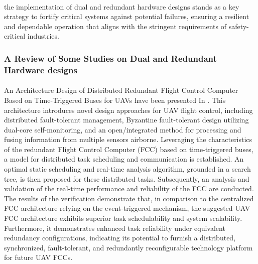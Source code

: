\paragraph*{}
the implementation of dual and redundant hardware designs stands as a key strategy to fortify critical systems against potential failures, ensuring a resilient and dependable operation that aligns with the stringent requirements of safety-critical industries.
\subsubsection{A Review of Some Studies on Dual and Redundant Hardware designs}
\paragraph*{}
An Architecture Design of Distributed Redundant Flight Control Computer Based on Time-Triggered Buses for UAVs have been presented In \cite{9201531}. This architecture introduces novel design approaches for UAV flight control, including distributed fault-tolerant management, Byzantine fault-tolerant design utilizing dual-core self-monitoring, and an open/integrated method for processing and fusing information from multiple sensors airborne. Leveraging the characteristics of the redundant Flight Control Computer (FCC) based on time-triggered buses, a model for distributed task scheduling and communication is established. An optimal static scheduling and real-time analysis algorithm, grounded in a search tree, is then proposed for these distributed tasks. Subsequently, an analysis and validation of the real-time performance and reliability of the FCC are conducted. The results of the verification demonstrate that, in comparison to the centralized FCC architecture relying on the event-triggered mechanism, the suggested UAV FCC architecture exhibits superior task schedulability and system scalability. Furthermore, it demonstrates enhanced task reliability under equivalent redundancy configurations, indicating its potential to furnish a distributed, synchronized, fault-tolerant, and redundantly reconfigurable technology platform for future UAV FCCs.
